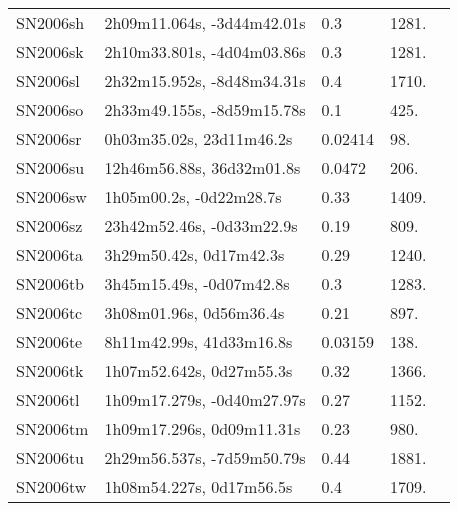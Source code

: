 \begin{longtable}{lllll}
         SN2006sh &     2h09m11.064s, -3d44m42.01s &      0.3 &          1281. &    \citet{2006IAUC.8784A...1G} \\
         SN2006sk &     2h10m33.801s, -4d04m03.86s &      0.3 &          1281. &    \citet{2006IAUC.8784A...1G} \\
         SN2006sl &     2h32m15.952s, -8d48m34.31s &      0.4 &          1710. &    \citet{2006IAUC.8784A...1G} \\
         SN2006so &     2h33m49.155s, -8d59m15.78s &      0.1 &           425. &    \citet{2006IAUC.8784A...1G} \\
         SN2006sr &       0h03m35.02s, 23d11m46.2s &  0.02414 &            98. &  \citet{1998AandAS..130..333T} \\
         SN2006su &      12h46m56.88s, 36d32m01.8s &   0.0472 &           206. &  \citet{1996AandAS..116...43P} \\
         SN2006sw &        1h05m00.2s, -0d22m28.7s &     0.33 &          1409. &    \citet{2006IAUC.8789A...1B} \\
         SN2006sz &      23h42m52.46s, -0d33m22.9s &     0.19 &           809. &    \citet{2006IAUC.8789A...1B} \\
         SN2006ta &        3h29m50.42s, 0d17m42.3s &     0.29 &          1240. &    \citet{2006IAUC.8789A...1B} \\
         SN2006tb &       3h45m15.49s, -0d07m42.8s &      0.3 &          1283. &    \citet{2006IAUC.8789A...1B} \\
         SN2006tc &        3h08m01.96s, 0d56m36.4s &     0.21 &           897. &    \citet{2006IAUC.8789A...1B} \\
         SN2006te &       8h11m42.99s, 41d33m16.8s &  0.03159 &           138. &    \citet{2004SDSS2.C...0000:} \\
         SN2006tk &       1h07m52.642s, 0d27m55.3s &     0.32 &          1366. &    \citet{2007IAUC.8807B...1C} \\
         SN2006tl &     1h09m17.279s, -0d40m27.97s &     0.27 &          1152. &    \citet{2007IAUC.8807B...1C} \\
         SN2006tm &      1h09m17.296s, 0d09m11.31s &     0.23 &           980. &    \citet{2007IAUC.8807B...1C} \\
         SN2006tu &     2h29m56.537s, -7d59m50.79s &     0.44 &          1881. &    \citet{2007IAUC.8807B...1C} \\
         SN2006tw &       1h08m54.227s, 0d17m56.5s &      0.4 &          1709. &    \citet{2007IAUC.8807B...1C} \\

\end{longtable}
